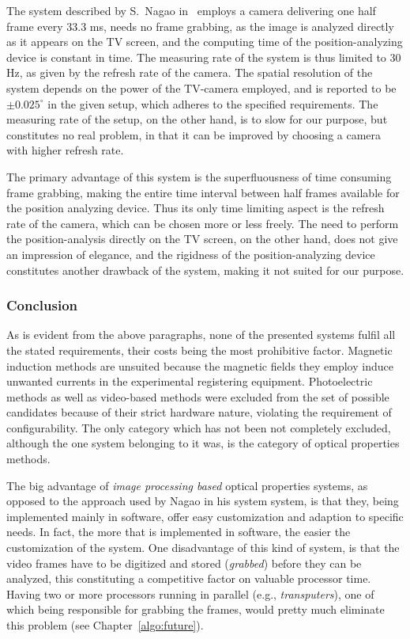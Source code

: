 The system described by S.\ Nagao in~\cite{tv} employs a camera
delivering one half frame every 33.3 ms, needs no frame grabbing, as
the image is analyzed directly as it appears on the TV screen, and the
computing time of the position-analyzing device is constant in time.
The measuring rate of the system is thus limited to 30 Hz, as given by
the refresh rate of the camera.  The spatial resolution of the system
depends on the power of the TV-camera employed, and is reported to be
$\pm 0.025^{\circ}$ in the given setup, which adheres to the specified
requirements.  The measuring rate of the setup, on the other hand, is
to slow for our purpose, but constitutes no real problem, in that it
can be improved by choosing a camera with higher refresh rate.

The primary advantage of this system is the superfluousness of time
consuming frame grabbing, making the entire time interval between half
frames available for the position analyzing device.  Thus its only
time limiting aspect is the refresh rate of the camera, which can be
chosen more or less freely.  The need to perform the position-analysis
directly on the TV screen, on the other hand, does not give an
impression of elegance, and the rigidness of the position-analyzing
device constitutes another drawback of the system, making it not
suited for our purpose.

\subsubsection{Conclusion}

As is evident from the above paragraphs, none of the presented systems
fulfil all the stated requirements, their costs being the most
prohibitive factor.  Magnetic induction methods are unsuited because
the magnetic fields they employ induce unwanted currents in the
experimental registering equipment.  Photoelectric methods as well as
video-based methods were excluded from the set of possible candidates
because of their strict hardware nature, violating the requirement of
configurability.  The only category which has not been not completely
excluded, although the one system belonging to it was, is the category
of optical properties methods.

The big advantage of {\em image processing based\/} optical properties
systems, as opposed to the approach used by Nagao in his system
system, is that they, being implemented mainly in software, offer easy
customization and adaption to specific needs.  In fact, the more that
is implemented in software, the easier the customization of the
system.  One disadvantage of this kind of system, is that the video
frames have to be digitized and stored ({\em grabbed\/}) before they
can be analyzed, this constituting a competitive factor on valuable
processor time.  Having two or more processors running in parallel
(e.g., {\em transputers\/}), one of which being responsible for
grabbing the frames, would pretty much eliminate this problem (see
Chapter~\ref{algo:future}).

